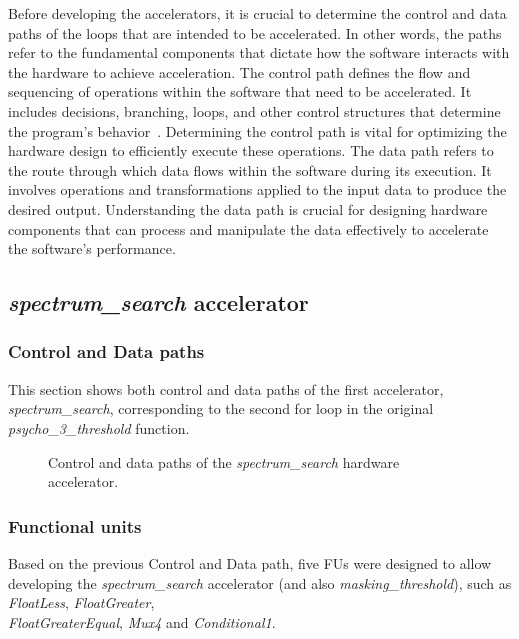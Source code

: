 Before developing the accelerators, it is crucial to determine the control and data paths of the loops that are intended to be accelerated. In other words, the paths refer to the fundamental components that dictate how the software interacts with the hardware to achieve acceleration.
The control path defines the flow and sequencing of operations within the software that need to be accelerated. It includes decisions, branching, loops, and other control structures that determine the program's behavior~\cite{datacontrolpath}. Determining the control path is vital for optimizing the hardware design to efficiently execute these operations.
The data path refers to the route through which data flows within the software during its execution. It involves operations and transformations applied to the input data to produce the desired output. Understanding the data path is crucial for designing hardware components that can process and manipulate the data effectively to accelerate the software's performance.

\subsection{\textit{spectrum\_search} accelerator}

\subsubsection{Control and Data paths}
This section shows both control and data paths of the first accelerator, \textit{spectrum\_search}, corresponding to the second for loop in the original \textit{psycho\_3\_threshold} function.

\begin{figure}[H]
\centerline{}
\caption{Control and data paths of the \textit{spectrum\_search} hardware accelerator.}
\label{data1}
\end{figure}

\subsubsection{Functional units}
Based on the previous Control and Data path, five FUs were designed to allow developing the \textit{spectrum\_search} accelerator (and also \textit{masking\_threshold}), such as \textit{FloatLess}, \textit{FloatGreater}, \\ \textit{FloatGreaterEqual}, \textit{Mux4} and \textit{Conditional1}.

